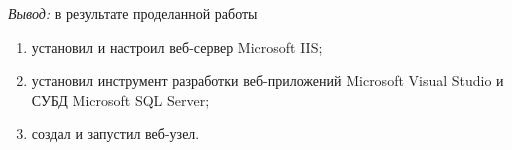 \documentclass[pscyr]{hedlab}
\begin{document}
  \vspace{-.5em}  
  \emph{Вывод:} в результате проделанной работы
  \vspace{-.5em}  
  \begin{enumerate}
    \itemsep -5pt
    \item установил и настроил веб-сервер Microsoft IIS;
    \item установил инструмент разработки веб-приложений Microsoft Visual
      Studio и СУБД Microsoft SQL Server;
    \item создал и запустил веб-узел.
  \end{enumerate}
\end{document}
